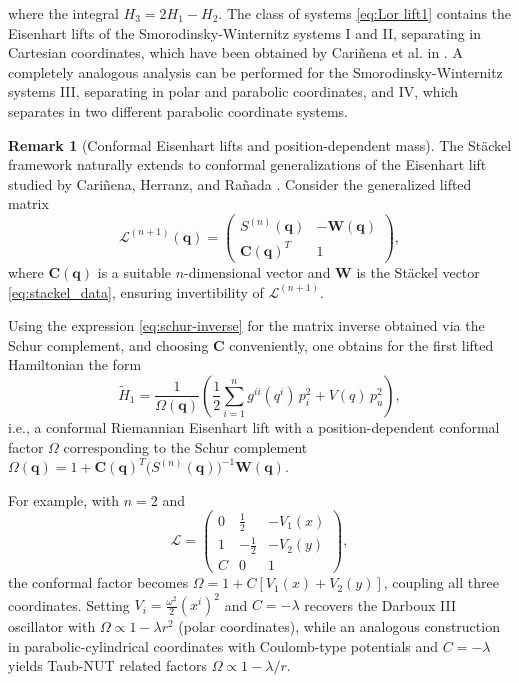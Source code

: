 \documentclass[10pt]{amsart}
\numberwithin{equation}{section}
\newcommand{\bs}{\boldsymbol}
\theoremstyle{definition}
\newtheorem{remark}{\textbf{Remark}}
\begin{document}
	where the integral $H_3=2 H_1-H_2$. 
The class of systems \eqref{eq:Lor lift1} contains the Eisenhart lifts of the Smorodinsky-Winternitz systems I and II, separating in Cartesian coordinates, which have been obtained by Cari\~nena et al.  in \cite{Carinena2017}. A completely analogous analysis can be performed for the Smorodinsky-Winternitz systems III, separating in polar and parabolic coordinates, and IV, which separates in two different parabolic coordinate systems.

\begin{remark}[Conformal Eisenhart lifts and position-dependent mass]\label{rmk:conformal}
	The Stäckel framework naturally extends to conformal generalizations of the Eisenhart lift studied by Cariñena, Herranz, and Rañada \cite{Carinena2017}. Consider the generalized lifted matrix
	\begin{equation}
		\mathcal{L}^{(n+1)}(\mathbf{q}) = \begin{pmatrix}
			S^{(n)}(\mathbf{q}) & -\mathbf{W}(\mathbf{q}) \\
			\mathbf{C}(\mathbf{q})^T & 1
		\end{pmatrix},
	\end{equation}
	where $\mathbf{C}(\mathbf{q})$ is a suitable $n$-dimensional vector and $\boldsymbol{W}$ is the St\"ackel vector \eqref{eq:stackel_data}, ensuring invertibility of $\mathcal{L}^{(n+1)}$. 
	

	
	
	
	Using the expression \eqref{eq:schur-inverse} for the matrix inverse obtained via the Schur complement, and choosing $\bs{C}$ conveniently, one obtains for the first lifted Hamiltonian the form
	\begin{equation}
		\tilde{H}_1
		= \frac{1}{\Omega(\boldsymbol{q})}
		\left(
		\frac{1}{2}\sum_{i=1}^n g^{ii}(q^i)\, p_i^2
		+ V(q)\, p_u^2
		\right),
	\end{equation}
	i.e., a conformal Riemannian Eisenhart lift with a position-dependent conformal
	factor $\Omega$ corresponding to the Schur complement
	$\Omega(\boldsymbol{q}) = 1 + \boldsymbol{C}(\boldsymbol{q})^{T}
	\bigl(S^{(n)}(\boldsymbol{q})\bigr)^{-1}\boldsymbol{W}(\boldsymbol{q})$.
	
	
	For example, with $n=2$ and
	\begin{equation}
		\mathcal{L} = \begin{pmatrix} 
			0 & \frac{1}{2} & -V_1(x) \\
			1 & -\frac{1}{2} & -V_2(y) \\
			C & 0 & 1 
		\end{pmatrix},
	\end{equation}
	the conformal factor becomes $\Omega = 1 + C[V_1(x) + V_2(y)]$, coupling all three coordinates. Setting $V_i = \frac{\omega^2}{2}(x^i)^2$ and $C = -\lambda$ recovers the Darboux III oscillator with $\Omega \propto 1 - \lambda r^2$ (polar coordinates), while an analogous construction in parabolic-cylindrical coordinates with Coulomb-type potentials and $C = -\lambda$ yields Taub-NUT related factors $\Omega \propto 1 - \lambda/r$.
	

\end{remark}
\end{document}
